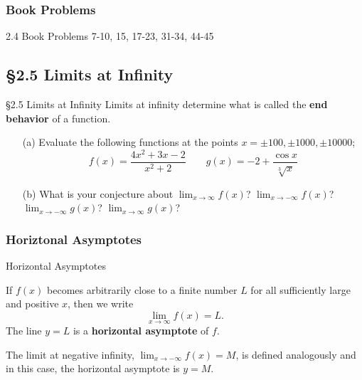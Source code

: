 \documentclass[Cal1Spr16Lectures.tex]{subfiles}
\begin{document}
\subsubsection{Book Problems}
\begin{frame}
\begin{block}{2.4 Book Problems} 7-10, 15, 17-23, 31-34, 44-45 \end{block}
\end{frame}

\subsection[2.5 Limits at Infinity]{\S 2.5 Limits at Infinity}

\begin{frame}{\S 2.5 Limits at Infinity}\footnotesize
Limits at infinity determine what is called the {\bf end behavior} of a function.
\begin{exe}
\begin{itemize}
\item[(a) ]Evaluate the following functions at the points $x=\pm100,\pm1000,\pm10000$;
\[f(x)=\frac{4x^2+3x-2}{x^2+2}\qquad g(x)=-2+\frac{\cos{x}}{\sqrt[3]{x}}
\]
\item[(b) ] What is your conjecture about $\lim_{x\to\infty}f(x)$?  $\lim_{x\to-\infty}f(x)$?  $\lim_{x\to-\infty}g(x)$?  $\lim_{x\to\infty}g(x)$?
\end{itemize}
\end{exe}
\end{frame}

\subsubsection{Horiztonal Asymptotes}
\begin{frame}{\small Horizontal Asymptotes}\footnotesize
\begin{dfn} If $f(x)$ becomes arbitrarily close to a finite number $L$ for all sufficiently large and positive $x$, then we write 
\[\lim_{x \to \infty}f(x)=L.\]
The line $y=L$ is a {\bf horizontal asymptote} of $f$. \end{dfn}  
The limit at negative infinity, $\displaystyle\lim_{x \to -\infty}f(x)=M$, is defined analogously and in this case, the horizontal asymptote is $y=M$.
\end{frame}

\end{document}
